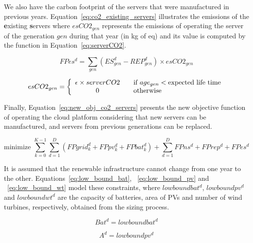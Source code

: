 We also have the carbon footprint of the servers that were manufactured in previous years. Equation~\eqref{eq:co2_existing_servers} illustrates the emissions of the \textbf{e}xisting \textbf{s}ervers where $esCO2_{gen}$ represents the emissions of operating the server of the generation $gen$ during that year (in kg of  eq) and its value is computed by the function in Equation~\eqref{eq:serverCO2}.


\begin{equation} \label{eq:co2_existing_servers}
FPes^d = \sum_{gen} ( ES_{gen}^d - REP_{gen}^d )  \times esCO2_{gen}
\end{equation}

\begin{equation} \label{eq:serverCO2}
esCO2_{gen} =  \left\{ 
  \begin{array}{ c l }
    \epsilon \times serverCO2   & \quad \textrm{if $age_{gen}$}    < \textrm{expected life time}   \\
    0     & \quad \textrm{otherwise  } \\
  \end{array}
\right.
\end{equation}


Finally, Equation~\eqref{eq:new_obj_co2_servers} presents the new objective function of operating the cloud platform considering that new servers can be manufactured, and servers from previous generations can be replaced.

\begin{equation} \label{eq:new_obj_co2_servers}
\text{minimize }\sum_{k=0}^{K-1} \sum_{d=1}^D ( FPgrid^d_k +  FPpv^d_k + FPbat^d_k) + \sum_{d=1}^D   FPns^d + FPrep^d + FPes^d 
\end{equation}

It is assumed that the renewable infrastructure cannot change from one year to the other. Equations~\eqref{eq:low_bound_bat},  ~\eqref{eq:low_bound_pv} and ~\eqref{eq:low_bound_wt} model these constraints, where $lowboundbat^d$, $lowboundpv^d$ and $lowboundwt^d$ are the capacity of batteries, area of PVs and number of wind turbines, respectively, obtained from the sizing process.

\begin{equation} \label{eq:low_bound_bat}
Bat^d = lowboundbat^d
\end{equation}

\begin{equation} \label{eq:low_bound_pv}
A^d = lowboundpv^d
\end{equation}

